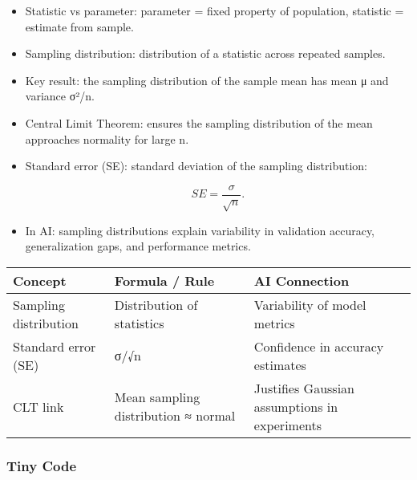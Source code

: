 \documentclass[
  letterpaper,
  DIV=11,
  numbers=noendperiod]{scrreprt}
\begin{document}
\begin{itemize}
\item
  Statistic vs parameter: parameter = fixed property of population,
  statistic = estimate from sample.
\item
  Sampling distribution: distribution of a statistic across repeated
  samples.
\item
  Key result: the sampling distribution of the sample mean has mean μ
  and variance σ²/n.
\item
  Central Limit Theorem: ensures the sampling distribution of the mean
  approaches normality for large n.
\item
  Standard error (SE): standard deviation of the sampling distribution:

  \[
  SE = \frac{\sigma}{\sqrt{n}}.
  \]
\item
  In AI: sampling distributions explain variability in validation
  accuracy, generalization gaps, and performance metrics.
\end{itemize}

\begin{longtable}[]{@{}
  >{\raggedright\arraybackslash}p{}
  >{\raggedright\arraybackslash}p{}
  >{\raggedright\arraybackslash}p{}@{}}
\toprule\noalign{}
\begin{minipage}[b]{\linewidth}\raggedright
Concept
\end{minipage} & \begin{minipage}[b]{\linewidth}\raggedright
Formula / Rule
\end{minipage} & \begin{minipage}[b]{\linewidth}\raggedright
AI Connection
\end{minipage} \\
\midrule\noalign{}
\endhead
\bottomrule\noalign{}
\endlastfoot
Sampling distribution & Distribution of statistics & Variability of
model metrics \\
Standard error (SE) & σ/√n & Confidence in accuracy estimates \\
CLT link & Mean sampling distribution ≈ normal & Justifies Gaussian
assumptions in experiments \\
\end{longtable}

\subsubsection{Tiny Code}\label{tiny-code-131}
\end{document}
